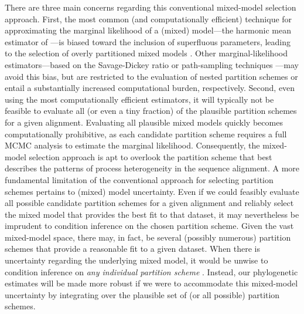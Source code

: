 \documentclass[11pt]{article}
\begin{document}
There are three main concerns regarding this conventional mixed-model selection approach.
First, the most common (and computationally efficient) technique for approximating the marginal likelihood of a (mixed) model---the harmonic mean estimator of \citet{newton94}---is biased toward the inclusion of superfluous parameters, leading to the selection of overly partitioned mixed models \citep[e.g.,][]{lartillot06,brown07,fan11}.  
Other marginal-likelihood estimators---based on the Savage-Dickey ratio \citep[e.g.,][]{verdinelli95,suchard01} or path-sampling techniques \citep[e.g.,][]{lartillot06,fan11,xie11,bael12,bael13,ronquist12}---may avoid this bias, but are restricted to the evaluation of nested partition schemes or entail a substantially increased computational burden, respectively. 
Second, even using the most computationally efficient estimators, it will typically not be feasible to evaluate all (or even a tiny fraction) of the plausible partition schemes for a given alignment.
Evaluating all plausible mixed models quickly becomes computationally prohibitive, as each candidate partition scheme requires a full MCMC analysis to estimate the marginal likelihood.
Consequently, the mixed-model selection approach is apt to overlook the partition scheme that best describes the patterns of process heterogeneity in the sequence alignment.
A more fundamental limitation of the conventional approach for selecting partition schemes pertains to (mixed) model uncertainty.
Even if we could feasibly evaluate all possible candidate partition schemes for a given alignment and reliably select the mixed model that provides the best fit to that dataset, it may nevertheless be imprudent to condition inference on the chosen partition scheme.
Given the vast mixed-model space, there may, in fact, be several (possibly numerous) partition schemes that provide a reasonable fit to a given dataset.
When there is uncertainty regarding the underlying mixed model, it would be unwise to condition inference on {\it any individual partition scheme}  \citep[cf.,][]{huelsenbeck04d, li12}.
Instead, our phylogenetic estimates will be made more robust if we were to accommodate this mixed-model uncertainty by integrating over the plausible set of (or all possible) partition schemes.
\end{document}
